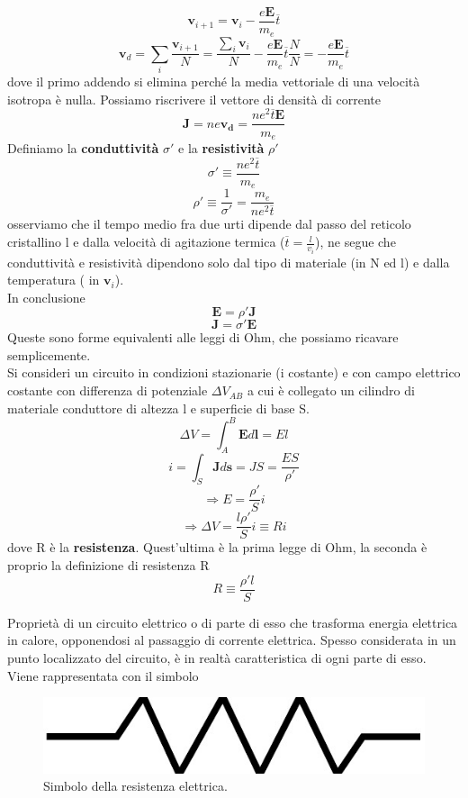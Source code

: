 \documentclass[
10pt, %
a4paper, %
oneside, %
headinclude,footinclude, %
BCOR5mm, %
]{scrartcl}
\begin{document}
\[\mathbf{v}_{i+1}  = \mathbf{v}_i - \frac{e\mathbf{E}}{m_e}\overline{t}\]
\[\mathbf{v}_d = \sum_i\frac{\mathbf{v}_{i+1}}{N}= \frac{\sum_i\mathbf{v}_i}{N} - \frac{e\mathbf{E}}{m_e}\overline{t} \frac{N}{N} = - \frac{e\mathbf{E}}{m_e}\overline{t}\]
dove il primo addendo si elimina perché la media vettoriale di una velocità isotropa è nulla. Possiamo riscrivere il vettore di densità di corrente
\[\mathbf{J}= ne\mathbf{v_d}= \frac{n e^2\overline{t}\mathbf{E}}{m_e}\]
Definiamo la \textbf{conduttività} $\sigma'$ e la \textbf{resistività} $\rho'$
\[\sigma' \equiv \frac{ne^2\overline{t}}{m_e}\]
\[\rho' \equiv \frac{1}{\sigma'}= \frac{m_e}{n e^2\overline{t}}\]
osserviamo che il tempo medio fra due urti dipende dal passo del reticolo cristallino l e dalla velocità di agitazione termica (\(\overline{t}= \frac{l}{v_i}\)), ne segue che conduttività e resistività dipendono solo dal tipo di materiale (in N ed l) e dalla temperatura ( in $\mathbf{v}_i$). \\
In conclusione
\[\mathbf{E}= \rho' \mathbf{J}\]
\[\mathbf{J}= \sigma' \mathbf{E}\]
Queste sono forme equivalenti alle leggi di Ohm, che possiamo ricavare semplicemente.\\
Si consideri un circuito in condizioni stazionarie (i costante) e con campo elettrico costante con differenza di potenziale \(\Delta V_{AB}\) a cui è collegato un cilindro di materiale conduttore di altezza l e superficie di base S. 
\[\Delta V = \int_{A}^{B}\mathbf{E}d\mathbf{l}=El\]
\[i = \int_S \mathbf{J}d\mathbf{s}= JS= \frac{E S}{\rho'}\]
\[\Rightarrow E = \frac{\rho'}{S}i\]
\[\Rightarrow \Delta V = \frac{l\rho'}{S}i \equiv R i\]
dove R è la \textbf{resistenza}. Quest'ultima è la prima legge di Ohm, la seconda è proprio la definizione di resistenza R
\[R \equiv \frac{\rho' l}{S}\]
\begin{definizione}[Resistenza]
Proprietà di un circuito elettrico o di parte di esso che trasforma energia elettrica in calore, opponendosi al passaggio di corrente elettrica. Spesso considerata in un punto localizzato del circuito, è in realtà caratteristica di ogni parte di esso. Viene rappresentata con il simbolo
\begin{figure}[h!]
	\centering
	\includegraphics[width=0.3\linewidth]{../images/resistenza}
	\caption{Simbolo della resistenza elettrica.}
	\label{fig:resistenza}
\end{figure}
\FloatBarrier
\end{definizione}
\end{document}
